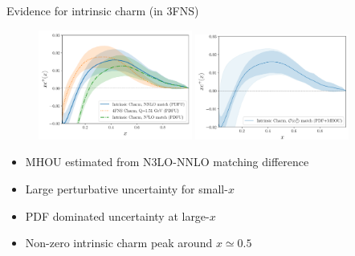 \documentclass[aspectratio=43, 8pt,t]{beamer}
\begin{document}
\begin{frame}{Evidence for intrinsic charm (in 3FNS)}
  \begin{figure}
    \includegraphics[width=0.45\textwidth]{4fns_3fns_nnlo_n3lo.pdf}
    \includegraphics[width=0.45\textwidth]{discovery_of_ic.png}
  \end{figure}
  \begin{itemize}
    \item MHOU estimated from N3LO-NNLO matching difference
    \item Large perturbative uncertainty for small-$x$
    \item PDF dominated uncertainty at large-$x$
    \item Non-zero intrinsic charm peak around $x \simeq 0.5$
  \end{itemize}
\end{frame}
\end{document}
